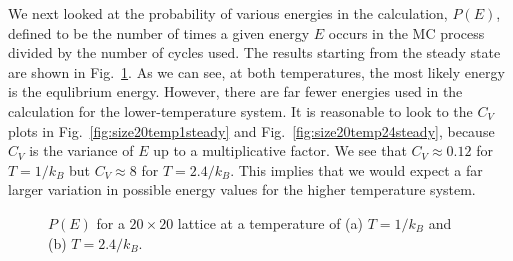 \documentclass[12pt]{article}
\numberwithin{equation}{section}
\begin{document}
\par We next looked at the probability of various energies in the calculation, $P(E)$, defined to be the number of times a given energy $E$ occurs in the MC process divided by the number of cycles used.  The results starting from the steady state are shown in Fig.~\ref{fig:size20pofE}.  As we can see, at both temperatures, the most likely energy is the equlibrium energy.  However, there are far fewer energies used in the calculation for the lower-temperature system.  It is reasonable to look to the $C_{V}$ plots in Fig.~\ref{fig:size20temp1steady} and Fig.~\ref{fig:size20temp24steady}, because $C_{V}$ is the variance of $E$ up to a multiplicative factor.  We see that $C_{V}\approx0.12$ for $T=1/k_{B}$ but $C_{V}\approx8$ for $T=2.4/k_{B}$.  This implies that we would expect a far larger variation in possible energy values for the higher temperature system.

\begin{figure}[h]
\begin{center}
\caption{$P(E)$ for a $20\times20$ lattice at a temperature of (a) $T=1/k_{B}$ and (b) $T=2.4/k_{B}$.}
\label{fig:size20pofE}
\end{center}
\end{figure}
\end{document}
